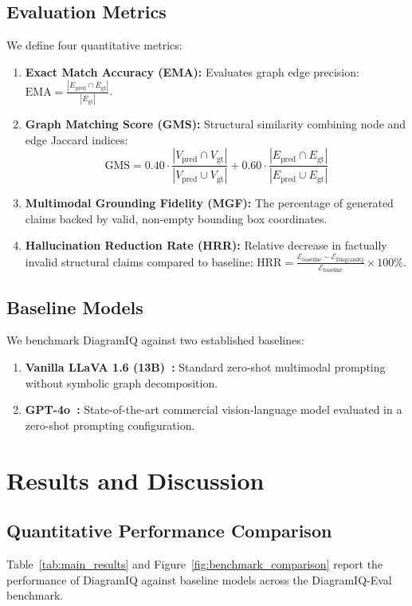 \documentclass[runningheads]{llncs}
\begin{document}
\subsection{Evaluation Metrics}
We define four quantitative metrics:
\begin{enumerate}
    \item \textbf{Exact Match Accuracy (EMA):} Evaluates graph edge precision: $\text{EMA} = \frac{|E_{\text{pred}} \cap E_{\text{gt}}|}{|E_{\text{gt}}|}$.
    \item \textbf{Graph Matching Score (GMS):} Structural similarity combining node and edge Jaccard indices:
    \begin{equation}
        \text{GMS} = 0.40 \cdot \frac{|V_{\text{pred}} \cap V_{\text{gt}}|}{|V_{\text{pred}} \cup V_{\text{gt}}|} + 0.60 \cdot \frac{|E_{\text{pred}} \cap E_{\text{gt}}|}{|E_{\text{pred}} \cup E_{\text{gt}}|}
    \end{equation}
    \item \textbf{Multimodal Grounding Fidelity (MGF):} The percentage of generated claims backed by valid, non-empty bounding box coordinates.
    \item \textbf{Hallucination Reduction Rate (HRR):} Relative decrease in factually invalid structural claims compared to baseline: $\text{HRR} = \frac{\mathcal{E}_{\text{baseline}} - \mathcal{E}_{\text{DiagramIQ}}}{\mathcal{E}_{\text{baseline}}} \times 100\%$.
\end{enumerate}

\subsection{Baseline Models}
We benchmark DiagramIQ against two established baselines:
\begin{enumerate}
    \item \textbf{Vanilla LLaVA 1.6 (13B)~\cite{liu2024llava16}:} Standard zero-shot multimodal prompting without symbolic graph decomposition.
    \item \textbf{GPT-4o~\cite{achiam2023gpt4}:} State-of-the-art commercial vision-language model evaluated in a zero-shot prompting configuration.
\end{enumerate}

\section{Results and Discussion}
\label{sec:results}

\subsection{Quantitative Performance Comparison}
Table~\ref{tab:main_results} and Figure~\ref{fig:benchmark_comparison} report the performance of DiagramIQ against baseline models across the DiagramIQ-Eval benchmark.
\end{document}
